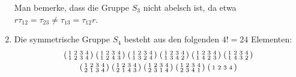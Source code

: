 \begin{bsp}
\begin{enumerate}[leftmargin=*]
   Man bemerke, dass die Gruppe $S_3$ nicht abelsch ist, da etwa $r \tau_{12} = \tau_{23} \neq \tau_{13} = \tau_{12} r$.
  
  \item
   Die symmetrische Gruppe $S_4$ besteht aus den folgenden $4! = 24$ Elementen:
   \begin{gather*}
    \begin{psmallmatrix}
     1 & 2 & 3 & 4 \\
     1 & 2 & 3 & 4
    \end{psmallmatrix}\;
    \begin{psmallmatrix}
     1 & 2 & 3 & 4 \\
     1 & 2 & 4 & 3
    \end{psmallmatrix}\;
    \begin{psmallmatrix}
     1 & 2 & 3 & 4 \\
     1 & 3 & 2 & 4
    \end{psmallmatrix}\;
    \begin{psmallmatrix}
     1 & 2 & 3 & 4 \\
     1 & 3 & 4 & 2
    \end{psmallmatrix}\;
    \begin{psmallmatrix}
     1 & 2 & 3 & 4 \\
     1 & 4 & 2 & 3
    \end{psmallmatrix}\;
    \begin{psmallmatrix}
     1 & 2 & 3 & 4 \\
     1 & 4 & 3 & 2
    \end{psmallmatrix}\\
    \begin{psmallmatrix}
     1 & 2 & 3 & 4 \\
     2 & 1 & 3 & 4
    \end{psmallmatrix}\;
    \begin{psmallmatrix}
     1 & 2 & 3 & 4 \\
     2 & 1 & 4 & 3
    \end{psmallmatrix}\;
    \begin{psmallmatrix}
     1 & 2 & 3 & 4 \\
     2 & 3 & 1 & 4
    \end{psmallmatrix}\;
    \begin{psmallmatrix}
     1 & 2 & 3 & 4 \\
     2 & 3 & 4 & 1
    \end{psmallmatrix}\;
    \begin{psmallmatrix}
     1 & 2 & 3 & 4 \\

\end{psmallmatrix}
\end{gather*}
\end{enumerate}
\end{bsp}

